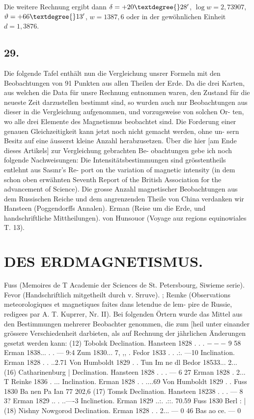 \documentclass[12pt,a4paper]{article}
\begin{document}
Die weitere Rechnung ergibt dann $\delta = +20\textdegree{} 28'$, $\log w = 2,73907$, $\vartheta = +66\textdegree{} 13'$, $w = 1387,6$ oder in der gewöhnlichen Einheit $d = 1,3876$.

\subsection*{29.}
Die folgende Tafel enthält nun die Vergleichung unsrer Formeln mit den Beobachtungen von 91 Punkten aus allen Theilen der Erde. Da die drei Karten, aus welchen die Data für unsre Rechnung entnommen waren, den Zustand für die neueste Zeit darzustellen bestimmt sind, so wurden auch nur Beobachtungen aus dieser in die Vergleichung aufgenommen, und vorzugsweise von solchen Or- ten, wo alle drei Elemente des Magnetismus beobachtet sind. Die Forderung einer genauen Gleichzeitigkeit kann jetzt noch nicht gemacht werden, ohne un- sern Besitz auf eine äusserst kleine Anzahl herabzusetzen. Über die hier [am Ende dieses Artikels] zur Vergleichung gebrachten Be- obachtungen gebe ich noch folgende Nachweisungen: Die Intensitätsbestimmungen sind grösstentheils entlehnt aus Sas\i{}nr's Re- port on the variation of magnetic intensity (in dem schon oben erwähnten Seventh Report of the British Association for the advancement of Science). Die grosse Anzahl magnetischer Beobachtungen aus dem Russischen Reiche und dem angrenzenden Theile von China verdanken wir Hansteen (Poggendorffs Annalen). Erman (Reise um die Erde, und handschriftliche Mittheilungen). von Hunsouor (Voyage auz regions equinowiales T. 13).


\newpage


\section*{DES ERDMAGNETISMUS.}
Fuss (Memoires de T Academie der Sciences de St. Petersbourg, Siwieme serie). Fevor (Handschriftlich mitgetheilt durch v. Srruve). ; Re\i{}nke (Observations meteorologiques et magnetiques faites dans letendue de lem- pire de Russie, redigees par A. T. Kuprrer, Nr. II). Bei folgenden Örtern wurde das Mittel aus den Bestimmungen mehrerer Beobachter genommen, die zum [heil unter einander grössere Verschiedenheit darbieten, als auf Rechnung der jährlichen Änderungen gesetzt werden kann: (12) Tobolsk Declination. Hansteen 1828 . . .
$---$
9\textdegree{} 58 Erman 1838... . . --- 9:4 Zum 1830... 7, ,, . Fedor 1833 . . .:. ---10 Inclination. Erman 1828 . . ..2.71 Von Humboldt 1829 . . Tun Im ne dl Bedor 18533... 2... (16) Catharinenburg | Declination. Hansteen 1828 . . . --- 6\textdegree{} 27 Erman 1828 . 2... T Reinke 1836 . ... Inclination. Erman 1828 . . ....69 Von Humboldt 1829 . . Fuss 1830 Ba nen Pa Ian 77 202,6 (17) Tomsk Declination. Hansteen 18238 . . . --- 8\textdegree{} 3? Erman 1829 .. . ..----3 Inclinetion. Erman 1829 ..:. .::. \guillemotleft{} 70.59 Fuss 1830 Berl : | (18) Nishny Nowgorod Declination. Erman 1828 . . 2... --- 0\textdegree{} 46 Bas ao ce. --- 0
\end{document}

